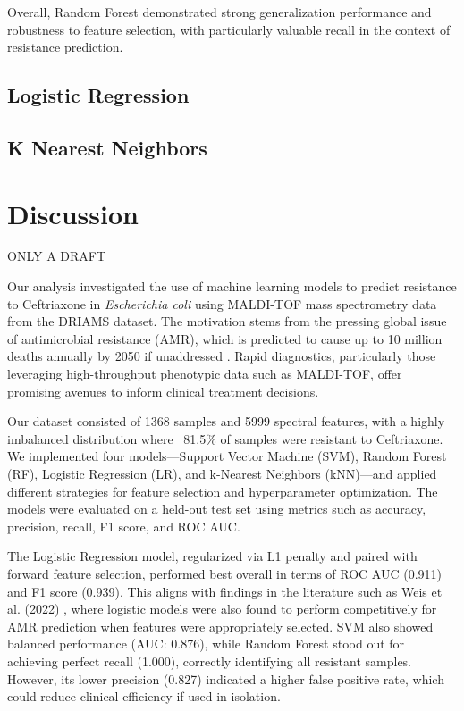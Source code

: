 \documentclass{article}
\begin{document}
Overall, Random Forest demonstrated strong generalization performance and robustness to feature selection, with particularly valuable recall in the context of resistance prediction.

\subsection{Logistic Regression}

\subsection{K Nearest Neighbors}

\section{Discussion}

ONLY A DRAFT

Our analysis investigated the use of machine learning models to predict resistance to Ceftriaxone in \textit{Escherichia coli} using MALDI-TOF mass spectrometry data from the DRIAMS dataset. The motivation stems from the pressing global issue of antimicrobial resistance (AMR), which is predicted to cause up to 10 million deaths annually by 2050 if unaddressed \citep{doi:10.1016/S1473-3099(15)70136-9}. Rapid diagnostics, particularly those leveraging high-throughput phenotypic data such as MALDI-TOF, offer promising avenues to inform clinical treatment decisions.

Our dataset consisted of 1368 samples and 5999 spectral features, with a highly imbalanced distribution where ~81.5\% of samples were resistant to Ceftriaxone. We implemented four models—Support Vector Machine (SVM), Random Forest (RF), Logistic Regression (LR), and k-Nearest Neighbors (kNN)—and applied different strategies for feature selection and hyperparameter optimization. The models were evaluated on a held-out test set using metrics such as accuracy, precision, recall, F1 score, and ROC AUC.

The Logistic Regression model, regularized via L1 penalty and paired with forward feature selection, performed best overall in terms of ROC AUC (0.911) and F1 score (0.939). This aligns with findings in the literature such as Weis et al. (2022) \citep{doi:10.1038/s41591-021-01619-9}, where logistic models were also found to perform competitively for AMR prediction when features were appropriately selected. SVM also showed balanced performance (AUC: 0.876), while Random Forest stood out for achieving perfect recall (1.000), correctly identifying all resistant samples. However, its lower precision (0.827) indicated a higher false positive rate, which could reduce clinical efficiency if used in isolation.
\end{document}
